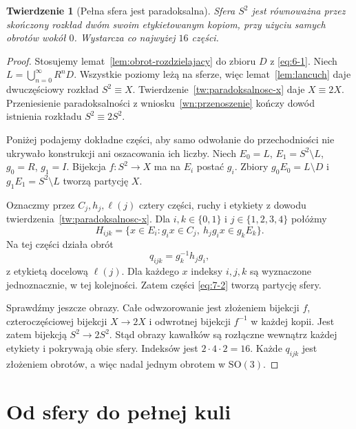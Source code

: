 \documentclass[11pt,a4paper]{article}
\numberwithin{equation}{section}
\theoremstyle{plain}
\newtheorem{twierdzenie}{Twierdzenie}[section]
\theoremstyle{definition}
\theoremstyle{remark}
\begin{document}
\begin{twierdzenie}[Pełna sfera jest paradoksalna]\label{tw:pelna-sfera}
Sfera $S^2$ jest równoważna przez skończony rozkład dwóm swoim etykietowanym kopiom, przy użyciu samych obrotów wokół $0$. Wystarcza co najwyżej $16$ części.
\end{twierdzenie}
\begin{proof}
Stosujemy lemat~\ref{lem:obrot-rozdzielajacy} do zbioru $D$ z \eqref{eq:6-1}. Niech $L=\bigcup_{n=0}^\infty R^nD$. Wszystkie poziomy leżą na sferze, więc lemat~\ref{lem:lancuch} daje dwuczęściowy rozkład $S^2\equiv X$. Twierdzenie~\ref{tw:paradoksalnosc-x} daje $X\equiv2X$. Przeniesienie paradoksalności z wniosku~\ref{wn:przenoszenie} kończy dowód istnienia rozkładu $S^2\equiv2S^2$.

Poniżej podajemy dokładne części, aby samo odwołanie do przechodniości nie ukrywało konstrukcji ani oszacowania ich liczby. Niech $E_0=L$, $E_1=S^2\setminus L$, $g_0=R$, $g_1=I$. Bijekcja $f:S^2\to X$ ma na $E_i$ postać $g_i$. Zbiory $g_0E_0=L\setminus D$ i $g_1E_1=S^2\setminus L$ tworzą partycję $X$.

Oznaczmy przez $C_j,h_j,\ell(j)$ cztery części, ruchy i etykiety z dowodu twierdzenia~\ref{tw:paradoksalnosc-x}. Dla $i,k\in\{0,1\}$ i $j\in\{1,2,3,4\}$ połóżmy
\begin{equation}\label{eq:7-2}
 H_{ijk}=\{x\in E_i:g_ix\in C_j,\ h_jg_ix\in g_kE_k\}.
\end{equation}
Na tej części działa obrót
\begin{equation}\label{eq:7-3}
 q_{ijk}=g_k^{-1}h_jg_i,
\end{equation}
z etykietą docelową $\ell(j)$. Dla każdego $x$ indeksy $i,j,k$ są wyznaczone jednoznacznie, w tej kolejności. Zatem części \eqref{eq:7-2} tworzą partycję sfery.

Sprawdźmy jeszcze obrazy. Całe odwzorowanie jest złożeniem bijekcji $f$, czteroczęściowej bijekcji $X\to2X$ i odwrotnej bijekcji $f^{-1}$ w każdej kopii. Jest zatem bijekcją $S^2\to2S^2$. Stąd obrazy kawałków są rozłączne wewnątrz każdej etykiety i pokrywają obie sfery. Indeksów jest $2\cdot4\cdot2=16$. Każde $q_{ijk}$ jest złożeniem obrotów, a więc nadal jednym obrotem w $\mathrm{SO}(3)$.
\end{proof}

\section{Od sfery do pełnej kuli}
\end{document}
